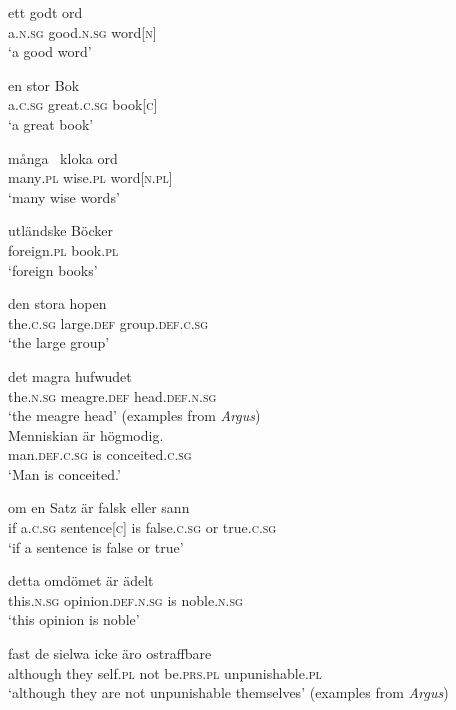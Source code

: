 \documentclass[output=paper]{langscibook}
\begin{document}
\ea\label{ex:intro:35}
\ea\label{ex:intro:35b}
\gll  ett       godt         ord\\
a.\textsc{n.sg}  good.\textsc{n.sg}  word[\textsc{n]}\\
\glt ‘a good word’

\ex\label{ex:intro:35a}
\gll  en       stor           Bok \\
a.\textsc{c.sg}  great.\textsc{c.sg}  book[\textsc{c]}\\
\glt ‘a great book’

\ex\label{ex:intro:35c}
\gll  många~  kloka    ord\\
    many\textsc{.pl}  wise\textsc{.pl}  word[\textsc{n.pl]}\\
    \glt ‘many wise words’

\ex\label{ex:intro:35d}
\gll  utländske   Böcker\\
    foreign.\textsc{pl}  book.\textsc{pl}\\
    \glt  ‘foreign books’

\ex\label{ex:intro:35e}
\gll  den     stora       hopen\\
    the.\textsc{c.sg} large.\textsc{def}   group.\textsc{def.c.sg}\\
\glt    ‘the large group’

\ex\label{ex:intro:35f}
\gll  det       magra       hufwudet\\
    the\textsc{.n.sg} meagre\textsc{.def}    head\textsc{.def.n.sg}\\
\glt    ‘the meagre head’
    (examples from \textit{Argus})\\
\z
\ex \label{ex:intro:36}
\ea \label{ex:intro:36a}
\gll  Menniskian       är högmodig. \\
man.\textsc{def.c.sg}   is   conceited.\textsc{c.sg}\\
\glt ‘Man is conceited.’

\ex \label{ex:intro:36b}
\gll  om   en       Satz       är   falsk       eller   sann\\
    if     a.\textsc{c.sg}     sentence[\textsc{c}] is   false.\textsc{c.sg}   or     true\textsc{.c.sg}\\
\glt `if a sentence is false or true’

\ex \label{ex:intro:36c}
\gll  detta       omdömet         är ädelt\\
    this.\textsc{n.sg}   opinion\textsc{.def.n.sg}    is noble\textsc{.n.sg}\\
\glt `this opinion is noble’

\ex \label{ex:intro:36d}
\gll  fast       de   sielwa   icke   äro       ostraffbare\\
    although   they   self.\textsc{pl}   not   be\textsc{.prs.pl}  unpunishable.\textsc{pl}\\
\glt `although they are not unpunishable themselves’ (examples from \textit{Argus})
\z
\z
\end{document}
